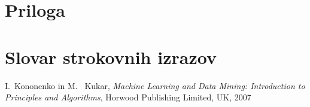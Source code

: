 \documentclass[mat1]{fmfdelo}
\begin{document}
\section{Priloga} 

\section*{Slovar strokovnih izrazov}

\geslo{}{}
\geslo{}{}

\begin{thebibliography}{99}

I.~Kononenko in M.~ Kukar, \emph{Machine Learning and Data Mining: Introduction to Principles and Algorithms}, Horwood Publishing Limited, UK, 2007



\end{thebibliography}
\end{document}
